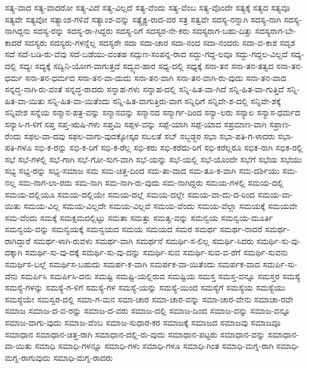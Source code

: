 {ಸತ್ಯ-ವಾದ
ಸತ್ಯ-ವಾದರೋ
ಸತ್ಯ-ವಿದೆ
ಸತ್ಯ-ವಿಲ್ಲದೆ
ಸತ್ಯ-ವೆಂದು
ಸತ್ಯ-ವೆಂಬ
ಸತ್ಯ-ವೊಂದೇ
ಸತ್ಯಕ್ಕೆ
ಸತ್ಯದ
ಸತ್ಯವೂ
ಸತ್ಯವೇ
ಸತ್ಯವೋ
ಸತ್ಯಾಂಶ-ಗಳಿವೆ
ಸತ್ಯಾಂಶ-ವನ್ನು
ಸತ್ಯೈಕ್ಯ-ರಾದ-ವರ
ಸತ್ರ
ಸತ್ವವೇ
ಸದಸ್ಯ-ನನ್ನಾಗಿ
ಸದಸ್ಯ-ನಾಗಿ
ಸದಸ್ಯ-ನಾಗಿದ್ದನು
ಸದಸ್ಯ-ರನ್ನು
ಸದಸ್ಯ-ರಾ-ಗಿದ್ದರು
ಸದಸ್ಯ-ರಿಗೆ
ಸದಸ್ಯರ-ನೇ-ಕರು
ಸದಸ್ಯರಾಗ-ಬಹು-ದಿತ್ತು
ಸದಸ್ಯರಾಗ-ಬೇ-ಕಾದರೆ
ಸದಸ್ಯರು
ಸದಸ್ಯರು-ಗಳನ್ನೆಲ್ಲ
ಸದಸ್ಯರೇ
ಸದಾ
ಸದಾ-ಚಾರ
ಸದಾ-ನಂದ
ಸದಾ-ನಂದರು
ಸದಾ-ವ-ಕಾಶ
ಸದೃಶ
ಸದೆ
ಸದೆ-ಬಡಿ-ರು-ವೆವು
ಸದೆ-ಬಡೆಯು-ವಂತಹ
ಸದ್ಗುಣ-ಸಂಪನ್ನ-ರಾದ
ಸದ್ದು-ಗದ್ದ-ಲವೂ
ಸದ್ದು-ಗದ್ದಲ-ವಿಲ್ಲದೆ
ಸದ್ಯ-ದಲ್ಲಿ
ಸದ್ಯಃ
ಸದ್ಯಕ್ಕೆ
ಸದ್ವಿನಿ-ಯೋಗ-ವಾಗುತ್ತದೆ
ಸದ್ವ್ಯವ-ಹಾರ
ಸಧ್ಯ-ದಲ್ಲಿ
ಸಧ್ಯಕ್ಕೆ
ಸನಾ-ತನ
ಸನಾ-ತನ-ತತ್ವದ
ಸನಾ-ತನ-ಧರ್ಮ
ಸನಾ-ತನ-ಧರ್ಮದ
ಸನಾ-ತನ-ವಾ-ದುದು
ಸನಾ-ತನ-ವಾಗಿ
ಸನಾ-ತನ-ವಾಗಿ-ರು-ವುದು
ಸನಾ-ತನ-ವಾದ
ಸನ್ನದ್ಧ-ನಾಗಿ-ರು-ವಂತೆ
ಸನ್ನದ್ಧ-ರಾದರು
ಸನ್ನಾಹ-ಗಳು
ಸನ್ನಾಹ-ದಲ್ಲಿ
ಸನ್ನಿ-ಹಿತ-ವಾ-ಗಿದೆ
ಸನ್ನಿ-ಹಿತ-ವಾ-ಗುತ್ತಿದೆ
ಸನ್ನಿ-ಹಿತ-ವಾ-ಯಿತು
ಸನ್ನಿ-ಹಿತ-ವಾ-ಯಿತೆಂದು
ಸನ್ನಿ-ಹಿತ-ವಾಗುತ್ತಿರು-ವಾಗ
ಸನ್ನಿಧಿಗೆ
ಸನ್ನಿವೇ-ಶ-ದಲ್ಲಿ
ಸನ್ನಿವೇ-ಶಕ್ಕೆ
ಸನ್ನಿವೇಶ
ಸನ್ನೆಯ
ಸನ್ಮಾನ-ಪತ್ರ-ವನ್ನು
ಸನ್ಮಾನವನ್ನು
ಸನ್ಮಾನದ
ಸನ್ಮಾರ್ಗ-ದಿಂದ
ಸನ್ಯಾ-ಲರು
ಸನ್ಯಾಲ
ಸನ್ಯಾಸ-ಧರ್ಮದ
ಸನ್ಯಾಸಿ-ಗ-ಳಿಗೆ
ಸಪ್ತ
ಸಪ್ತ-ಋಷಿ-ಗಳು
ಸಪ್ತಮಿ
ಸಪ್ಪಳ-ವನ್ನು
ಸಪ್ಪೆ-ಯಾಗಿ
ಸಪ್ಪೆ-ಯಾದ
ಸಪ್ರಮಾಣ-ವಾಗಿ
ಸಪ್ರಾಣ-ರೆಂದು
ಸಫಲ-ವಾ-ದವು
ಸಫಲ-ವಾಗು-ವುದಕ್ಕೋಸ್ಕರ
ಸಬಲತೆ
ಸಬ್
ಸಬ್ಜಡ್ಜರ
ಸಭಾ
ಸಭಾ-ಪತಿ-ಗ-ಳಾದರು
ಸಭಾ-ಪತಿ-ಗಳೂ
ಸಭಿ-ಕ-ರನ್ನು
ಸಭಿ-ಕ-ರಿಗೆ
ಸಭಿ-ಕ-ರೆಲ್ಲ
ಸಭಿ-ಕರು
ಸಭಿ-ಕರೆದು-ರಿಗೆ
ಸಭಿ-ಕರೆಲ್ಲರೂ
ಸಭಿಕ-ನಾಗಿ
ಸಭಿಕ-ರಲ್ಲಿ
ಸಭೆ
ಸಭೆ-ಗಳಲ್ಲಿ
ಸಭೆ-ಗಾಗಿ
ಸಭೆ-ಗೋ-ಸುಗ-ವಾಗಿ
ಸಭೆ-ಯನ್ನು
ಸಭೆ-ಯಲ್ಲಿ
ಸಭೆ-ಯೊಂದೇ
ಸಭೆಗೆ
ಸಭೆಯ
ಸಭೆಯು
ಸಭ್ಯ
ಸಭ್ಯ-ರನ್ನು
ಸಭ್ಯ-ಸಮಾಜ
ಸಮ
ಸಮ-ಚಿತ್ತ-ದಿಂದ
ಸಮ-ತಾ-ವಾದ
ಸಮ-ತೂ-ಕ-ವಾಗಿ
ಸಮ-ದರ್ಶಿಯು
ಸಮ-ನಲ್ಲ
ಸಮ-ನಾಗ-ಲಾ-ರದು
ಸಮ-ನಾಗಿ
ಸಮ-ನಾಗಿ-ರು-ವುದು
ಸಮ-ನಾಗಿದ್ದರು
ಸಮಯ-ಗಳಲ್ಲಿ
ಸಮಯ-ದಲ್ಲಿ
ಸಮಯ-ದಲ್ಲಿಯೂ
ಸಮಯ-ದಲ್ಲಿಯೇ
ಸಮಯ-ದಲ್ಲೆ
ಸಮಯ-ದಲ್ಲೇ
ಸಮಯ-ವಾ-ದು-ದ-ರಿಂದ
ಸಮಯ-ವಾ-ಯಿತು
ಸಮಯ-ವಿಲ್ಲ
ಸಮಯ-ವಿಲ್ಲದೇ
ಸಮಯ-ವಿಲ್ಲವೆ
ಸಮಯ-ವೆಂದು
ಸಮಯ-ವೆಲ್ಲಾ
ಸಮಯಕ್ಕೆ
ಸಮಯವೇ
ಸಮ-ವೆಂದು
ಸಮಕ್ಕೆ
ಸಮಕ್ಷಮದಲ್ಲಿಟ್ಟು
ಸಮತಾ
ಸಮತ್ತು
ಸಮತ್ವ-ವನ್ನು
ಸಮನ್ವಯ
ಸಮನ್ವಯ-ಮೂರ್ತಿ
ಸಮನ್ವಯ-ವನ್ನು
ಸಮನ್ವಯಕ್ಕೆ
ಸಮನ್ವಯದ
ಸಮಯ
ಸಮಯದ
ಸಮರ
ಸಮರ್ಥ
ಸಮರ್ಥ-ನಾದರೆ
ಸಮರ್ಥ-ರಾಗಿದ್ದಾರೆ
ಸಮರ್ಥ-ಳಾಗಿ-ರುವಳು
ಸಮರ್ಥ-ವಾಗಿ
ಸಮರ್ಥನೆ
ಸಮರ್ಥಿ-ಸ-ಲಿಲ್ಲ
ಸಮರ್ಥಿ-ಸಿದರು
ಸಮರ್ಥಿ-ಸು-ವು-ದಕ್ಕಾಗಿ
ಸಮರ್ಥಿ-ಸು-ವು-ದಕ್ಕೆ
ಸಮರ್ಥಿ-ಸು-ವು-ದನ್ನು
ಸಮರ್ಥಿ-ಸುವ
ಸಮರ್ಥಿ-ಸುವ-ವ-ರೆಗೆ
ಸಮರ್ಥಿ-ಸುವನು
ಸಮರ್ಥಿಸ-ಬಲ್ಲೆ
ಸಮರ್ಥಿಸ-ಬಹುದು
ಸಮರ್ಪ-ಕ-ವಾಗಿ
ಸಮರ್ಪಕ-ವಾ-ಯಿತೆಂದು
ಸಮರ್ಪಕ-ವಾದ
ಸಮರ್ಪಿ-ಸು-ವೆನು
ಸಮರ್ಪಿಸಿ
ಸಮರ್ಪಿಸಿ-ದನು
ಸಮಷ್ಟಿ
ಸಮಷ್ಟಿ-ಯಲ್ಲಿರುವ
ಸಮಷ್ಟಿಯ
ಸಮಸ್ತ
ಸಮಸ್ತ-ವನ್ನೂ
ಸಮಸ್ತರ
ಸಮಸ್ಯೆ
ಸಮಸ್ಯೆ-ಗಳನ್ನು
ಸಮಸ್ಯೆ-ಗ-ಳಿಗೆ
ಸಮಸ್ಯೆ-ಗಳ
ಸಮಸ್ಯೆ-ಯನ್ನು
ಸಮಸ್ಯೆ-ಯಿಂದ
ಸಮಸ್ಯೆಗೆ
ಸಮಸ್ಯೆಯ
ಸಮಸ್ಯೆಯು
ಸಮಸ್ಯೆಯೇ
ಸಮಸ್ವರ-ದಲ್ಲಿ
ಸಮಾ-ಗ-ಮನ
ಸಮಾ-ಚಾರ
ಸಮಾ-ಚಾರ-ವನ್ನು
ಸಮಾ-ಚಾರ-ವೇನು
ಸಮಾಚಾ-ರವೇ
ಸಮಾಜ
ಸಮಾಜ-ದ-ವ-ರನ್ನು
ಸಮಾಜ-ದ-ವರು
ಸಮಾಜ-ದಲ್ಲಿ
ಸಮಾಜ-ದಿಂದ
ಸಮಾಜ-ವನ್ನು
ಸಮಾಜ-ವನ್ನೂ
ಸಮಾಜ-ವಾಗು-ವುದು
ಸಮಾಜ-ವೆಂಬ
ಸಮಾಜ-ಸುಧಾರ-ಕರ
ಸಮಾಜಕ್ಕೆ
ಸಮಾಜದ
ಸಮಾಜವು
ಸಮಾಜವೂ
ಸಮಾಧಾನ
ಸಮಾಧಾನ-ಚಿತ್ತ-ರಾಗಿ
ಸಮಾಧಾನ-ದಲ್ಲಿ-ರು-ವುದು
ಸಮಾಧಾನ-ಪಟ್ಟರು
ಸಮಾಧಾನ-ವನ್ನು
ಸಮಾಧಾನ-ವಾ-ಯಿತು
ಸಮಾಧಿ
ಸಮಾಧಿ-ಗಳನ್ನೂ
ಸಮಾಧಿ-ಗಳು
ಸಮಾಧಿ-ಗಳೂ
ಸಮಾಧಿ-ಗಿಂತ
ಸಮಾಧಿ-ಮಗ್ನ-ರಾಗಿ
ಸಮಾಧಿ-ಮಗ್ನ-ರಾಗುವುದು
ಸಮಾಧಿ-ಮಗ್ನ-ರಾದರು
}
